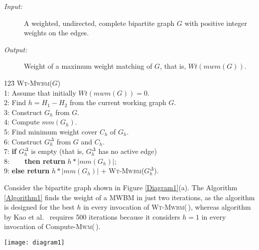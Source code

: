 \documentclass[runningheads,a4paper]{llncs}
\begin{document}
\begin{algorithm}[H]
\caption{Compute weight of a maximum weight matching of $G$.}
\label{Algorithm1}
\begin{description}
\item[\it Input:] A weighted, undirected, complete bipartite graph $G$ with positive  integer weights on the edges.
\item[\it Output:] Weight of a maximum weight matching of $G$, that is, $\textit{Wt}(\textit{mwm}(G))$.
\end{description}
\begin{tabbing}
123\=\kill
\textsc{Wt-Mwbm($G$)}\+\\
1: Assume that initially $\textit{Wt}(\textit{mwm}(G))=0$.\\
2: Find $h=H_1-H_2$ from the current working graph $G$.\\
3: Construct $G_h$ from $G$.\\
4: Compute $\textit{mm}(G_h)$.\\
5: Find minimum weight cover $C_h$ of $G_h$.\\
6: Construct $G_h^\Delta$ from $G$ and $C_h$.\\
7: \= {\bf if} $G_h^\Delta$ is empty (that is, $G_h^\Delta$ has no active edge)\\
8: \>~~~ {\bf then return}  $h * |\textit{mm}(G_h)|$;\\
9: \> {\bf else return} $h * |\textit{mm}(G_h)|$ + \textsc{Wt-Mwbm($G_h^\Delta$)}.
\end{tabbing}
\end{algorithm}

\begin{example}
Consider the bipartite graph shown in Figure \ref{Diagram1}(a). The Algorithm
\ref{Algorithm1} finds the weight of a MWBM in just two iterations, as
the algorithm is designed for the best $h$ in every invocation of \textsc{Wt-Mwbm(\,)},
whereas algorithm by Kao et al.~\cite{kao02} requires 500 iterations because it
considers $h=1$ in every invocation of  Compute-\textsc{Mwm}(\,).
\begin{figure*}[htpb]
\centering
\texttt{[image: diagram1]}
\caption[Illustration of the modified decomposition theorem on  an undirected, weighted bipartite graph $G$.]{{\bf(a)} An undirected, weighted bipartite graph $G$ with positive integer weights on the edges. In the  current graph $G$, $h=495$. {\bf(b)}
$G_h$ is extracted. {\bf(c)} $C_h$ is the weighted cover of $G_h$.
{\bf(d)} $G_h^\Delta$ is formed from $G_h$ and $C_h$. Compute 
\textsc{Wt-Mwbm$(G_h^\Delta)$}.}
\label{Diagram1}
\end{figure*}
\end{example}
\end{document}
